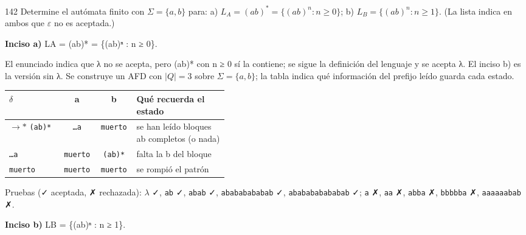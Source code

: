 \documentclass[11pt]{article}
\begin{document}
\begin{ejercicio}{142}{}
Determine el autómata finito con $\Sigma = \{a, b\}$ para: a) $L_A = (ab)^* = \{(ab)^n : n \ge 0\}$; b) $L_B = \{(ab)^n : n \ge 1\}$. (La lista indica en ambos que $\varepsilon$ no es aceptada.)
\end{ejercicio}
\proc 

\textbf{Inciso a)} LA = (ab)* = \{(ab)ⁿ : n ≥ 0\}.

El enunciado indica que λ no se acepta, pero (ab)* con n ≥ 0 sí la contiene; se sigue la definición del lenguaje y se acepta λ. El inciso b) es la versión sin λ. Se construye un AFD con $|Q| = 3$ sobre $\Sigma = \{a, b\}$; la tabla indica qué información del prefijo leído guarda cada estado.
\begin{center}\small\begin{tabular}{lccp{0.42\linewidth}}\toprule
$\delta$ & a & b & Qué recuerda el estado \\\midrule
$\to$$*$ \texttt{(ab)*} & \texttt{…a} & \texttt{muerto} & se han leído bloques ab completos (o nada) \\
 \texttt{…a} & \texttt{muerto} & \texttt{(ab)*} & falta la b del bloque \\
 \texttt{muerto} & \texttt{muerto} & \texttt{muerto} & se rompió el patrón \\
\bottomrule\end{tabular}\end{center}
Pruebas (✓ aceptada, ✗ rechazada): $\lambda$ ✓, \texttt{ab} ✓, \texttt{abab} ✓, \texttt{abababababab} ✓, \texttt{ababababababab} ✓; \texttt{a} ✗, \texttt{aa} ✗, \texttt{abba} ✗, \texttt{bbbbba} ✗, \texttt{aaaaaabab} ✗.


\textbf{Inciso b)} LB = \{(ab)ⁿ : n ≥ 1\}.
\end{document}

